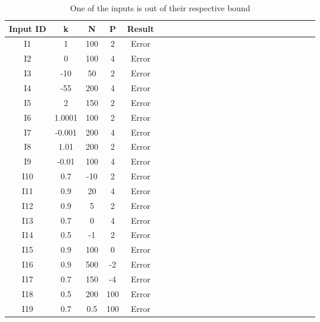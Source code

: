 \documentclass[12pt, titlepage]{article}
\begin{document}
\begin{table}[h!]
	\centering
	\begin{tabular}{|c|c|c|c|c|c|c|c|c|c|c|c|c|c|c|c|c|c|c|c|c|c|c|c|}
		\hline        
		Input ID& k& N & P & Result \\
		\hline
		I1     &1 &100 &2 & Error \\ \hline
		I2     &0 &100 &4 & Error\\ \hline 
		I3     &-10 &50 &2 &Error \\ \hline 
		I4      &-55 &200 &4 &Error \\ \hline
		I5     &2 &150 & 2& Error\\ \hline
		I6     &1.0001 & 100 &2 & Error \\ \hline
		I7     &-0.001 & 200 &4 & Error\\ \hline 
		I8     &1.01 & 200 &2 &Error \\ \hline 
		I9      &-0.01 &100 &4 &Error \\ \hline
		I10     &0.7 & -10 &2 & Error \\ \hline
		I11     &0.9 & 20 &4 & Error\\ \hline 
		I12     &0.9 & 5 &2 &Error \\ \hline 
		I13      &0.7 &0 &4 &Error \\ \hline
		I14     &0.5 & -1 & 2& Error\\ \hline 
		I15    &0.9 & 100 &0 & Error\\ \hline 
		I16     &0.9 & 500 &-2 &Error \\ \hline 
		I17      &0.7 &150 &-4 &Error \\ \hline
		I18     &0.5 & 200 & 100& Error\\ \hline 
		I19     &0.7 & 0.5 & 100& Error \\
		\hline
	\end{tabular}\\
	\caption{One of the inputs is out of their respective bound}
	\label{Table:D_12}
\end{table}  
\end{document}
